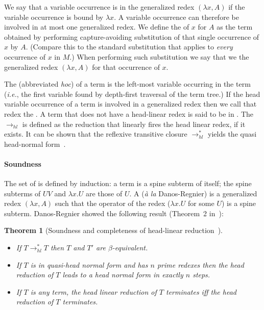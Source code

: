 \documentclass{elsarticle}
\makeatletter
\theoremstyle{plain}
\newtheorem{theorem}{Theorem}[section]
\theoremstyle{definition}
\theoremstyle{remark}
\renewcommand\ie{{\it i.e.\@\xspace}}
\newcommand{\hlred}{\rightarrow_{hl}}
\makeatother
\begin{document}
We say that a variable occurrence is  in the generalized redex $(\lambda x, A)$ if the variable occurrence is bound by $\lambda x$. A variable occurrence can therefore be involved in at most one generalized redex. We define the  of $x$ for $A$ as the term obtained by performing capture-avoiding substitution of that single occurrence of $x$ by $A$. (Compare this to the standard substitution that applies to \emph{every} occurrence of $x$ in $M$.) When performing such substitution we say that we  the generalized redex $(\lambda x, A)$ for that occurrence of $x$.

The  (abbreviated \emph{hoc}) of a term is the left-most variable occurring in the term (\ie, the first variable found by depth-first traversal of the term tree.) If the head variable occurrence of a term is involved in a generalized redex then we call that redex the .
A term that does not have a head-linear redex is said to be in .
The  $\hlred$ is defined as the reduction that linearly fires the head linear redex, if it exists. It can be shown that the reflexive transitive closure $\rightarrow^*_{hl}$ yields the quasi head-normal form~\cite{danos-head,danosherbelinregnier1996}.

\paragraph{Soundness}
The set of  is defined by induction: a term is a spine subterm of itself; the spine subterms of $U V$ and $\lambda x. U$ are those of $U$.
A  ({\it \`a la} Danos-Regnier) is a generalized redex $(\lambda x, A)$ such that the operator of the redex ($\lambda x . U$ for some $U$) is a spine subterm. Danos-Regnier showed the following result (Theorem~2 in~\cite{danos-head}):
\begin{theorem}[Soundness and completeness of head-linear reduction~\cite{danos-head}] \
\label{thm:danosregnier_headlinred}
\begin{itemize}[nosep]
\item If $T \rightarrow^*_{hl} T$  then $T$ and $T'$ are $\beta$-equivalent.
\item If $T$ is in quasi-head normal form and has $n$ prime redexes then the head reduction of $T$ leads to a head normal form in exactly $n$ steps.
\item If $T$ is any term, the head linear reduction of $T$ terminates iff the head reduction of $T$ terminates.
\end{itemize}
\end{theorem}
\end{document}
